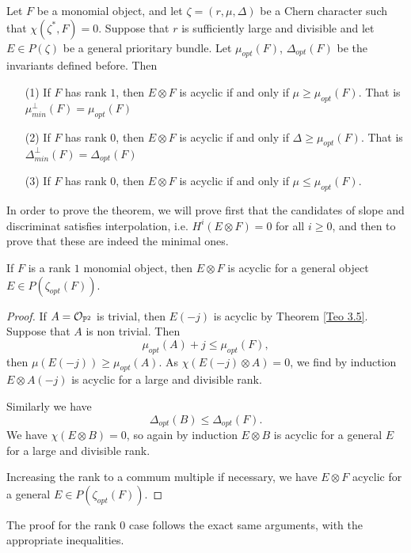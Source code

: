 \documentclass[
	oldfontcommands,
	sumario=abnt-6027-2012,
	12pt,			%
	openright,		%
	oneside,		%
	a4paper,		%
	english,		%
	brazil			%
	]{imecc-unicamp}
\begin{document}
\begin{teorema}
	Let $F$ be a monomial object, and let $\zeta=(r,\mu,\Delta)$ be a Chern character such that $\chi(\zeta^*,F)=0$. Suppose that $r$ is sufficiently large and divisible and let $E\in P(\zeta)$ be a general prioritary bundle. Let $\mu_{opt}(F)$, $\Delta_{opt}(F)$ be the invariants defined before. Then \begin{enumerate}
		\item[(1)] If $F$ has rank $1$, then $E\otimes F$ is acyclic if and only if $\mu\geq \mu_{opt}(F)$. That is $\mu^\perp_{min}(F)=\mu_{opt}(F)$
		\item[(2)] If $F$ has rank $0$, then $E\otimes F$ is acyclic if and only if $\Delta\geq \mu_{opt}(F)$. That is $\Delta^\perp_{min}(F)=\Delta_{opt}(F)$
		\item[(3)] If $F$ has rank $0$, then $E\otimes F$ is acyclic if and only if $\mu\le \mu_{opt}(F)$.
	\end{enumerate}
	
	
	
\end{teorema}

In order to prove the theorem, we will prove first that the candidates of slope and discriminat satisfies interpolation, i.e. $H^i(E\otimes F)=0$ for all $i\geq0$, and then to prove that these are indeed the minimal ones.
\begin{lema}
	If $F$ is a rank $1$ monomial object, then $E\otimes F$ is acyclic for a general object $E\in P(\zeta_{opt}(F))$.
\end{lema}
\begin{proof}
	If $A={\mathcal O}_{{\mathbb P}^2}$ is trivial, then $E(-j)$ is acyclic by Theorem \ref{Teo 3.5}. Suppose that $A$ is non trivial. Then $$\mu_{opt}(A)+j\le\mu_{opt}(F),$$ then $\mu(E(-j))\geq \mu_{opt}(A)$. As $\chi(E(-j)\otimes A)=0$, we find by induction $E\otimes A(-j)$ is acyclic for a large and divisible rank.
	
	Similarly we have $$
	\Delta_{opt}(B)\le\Delta_{opt}(F).
	$$ 
	We have $\chi(E\otimes B)=0$, so again by induction $E\otimes B$ is acyclic for a general $E$ for a large and divisible rank.
	
	Increasing the rank to a commum multiple if necessary, we have $E\otimes F$ acyclic for a general $E\in P(\zeta_{opt}(F))$.
\end{proof}

The proof for the rank $0$ case follows the exact same arguments, with the appropriate inequalities.
\end{document}

